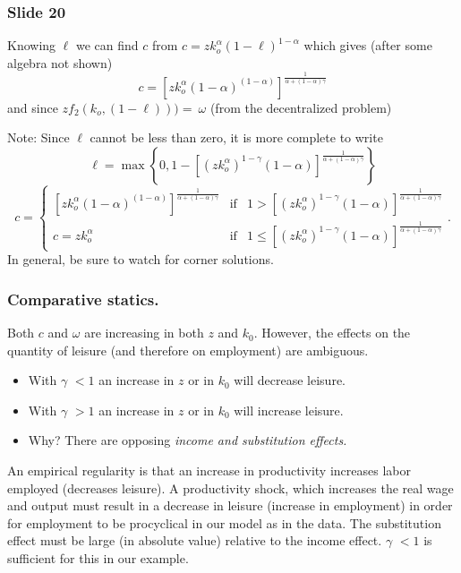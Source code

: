 \documentclass[aspectratio=169]{ltx-talk}
\begin{document}
\begin{frame}
\frametitle{Slide 20}
Knowing $\ell $ we can find $c$ from $c=zk_{o}^{\alpha }\left(
1-\ell \right) ^{1-\alpha }$ which gives (after some algebra not shown)%
\begin{equation*}
c=\left[ zk_{o}^{\alpha }\left( 1-\alpha \right) ^{\left( 1-\alpha \right) }%
\right] ^{\frac{1}{\alpha +\left( 1-\alpha \right) \gamma }}
\end{equation*}%
and since $zf_{2}\left( k_{o},\left( 1-\ell \right) \right) )=\ \omega $
(from the decentralized problem) $\allowbreak $

Note: Since $\ell $ cannot be less than zero, it is more complete to write 
\begin{equation*}
\ell =\max \left\{ 0,1-\left[ \left( zk_{o}^{\alpha }\right) ^{1-\gamma
}\left( 1-\alpha \right) \right] ^{\frac{1}{\alpha +\left( 1-\alpha \right)
\gamma }}\right\}
\end{equation*}%
\begin{equation*}
c=\left\{ 
\begin{array}{ccc}
\left[ zk_{o}^{\alpha }\left( 1-\alpha \right) ^{\left( 1-\alpha \right) }%
\right] ^{\frac{1}{\alpha +\left( 1-\alpha \right) \gamma }} & \text{if} & 
1> \left[ \left( zk_{o}^{\alpha }\right) ^{1-\gamma }\left( 1-\alpha \right) %
\right] ^{\frac{1}{\alpha +\left( 1-\alpha \right) \gamma }} \\ 
c=zk_{o}^{\alpha } & \text{if} & 1\leq \left[ \left( zk_{o}^{\alpha }\right)
^{1-\gamma }\left( 1-\alpha \right) \right] ^{\frac{1}{\alpha +\left(
1-\alpha \right) \gamma }}%
\end{array}%
\right. .
\end{equation*}%
In general, be sure to watch for corner solutions.
\end{frame}

\begin{frame}
\frametitle{Comparative statics.}
Both $c$ and $\omega $ are increasing in both $%
z$ and $k_{0}$. However, the effects on the quantity of leisure (and
therefore on employment) are ambiguous.

\begin{itemize}
\item With $\gamma $ $<1$ an increase in $z$ or in $k_{0}$ will decrease
leisure.

\item With $\gamma $ $>1$ an increase in $z$ or in $k_{0}$ will increase
leisure.

\item Why? There are opposing \textit{income and substitution effects. }
\end{itemize}

An empirical regularity is that an increase in productivity increases labor
employed (decreases leisure). A productivity shock, which increases the real
wage and output must result in a decrease in leisure (increase in
employment) in order for employment to be procyclical in our model as in the
data. The substitution effect must be large (in absolute value) relative to
the income effect. $\gamma $ $<1$ is sufficient for this in our example.
\end{frame}
\end{document}
